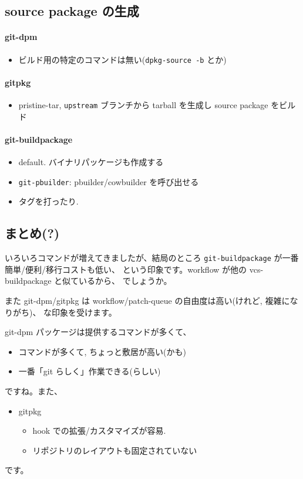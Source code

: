 \documentclass[mingoth,a4paper]{jsarticle}
\begin{document}
\subsection*{source package の生成}
\label{sec-5}

\label{sec-5-1}
\paragraph{git-dpm}
\label{sec-5-1-1}

\begin{itemize}
\item ビルド用の特定のコマンドは無い(\texttt{dpkg-source -b} とか)
\end{itemize}
\paragraph{gitpkg}
\label{sec-5-1-2}

\begin{itemize}
\item pristine-tar, \texttt{upstream} ブランチから tarball を生成し
      source package をビルド
\end{itemize}
\paragraph{git-buildpackage}
\label{sec-5-1-3}

\begin{itemize}
\item default. バイナリパッケージも作成する
\item \texttt{git-pbuilder}: pbuilder/cowbuilder を呼び出せる
\item タグを打ったり.
\end{itemize}
\subsection*{まとめ(?)}
\label{sec-6}

いろいろコマンドが増えてきましたが、結局のところ
\texttt{git-buildpackage} が一番簡単/便利/移行コストも低い、
という印象です。workflow が他の vcs-buildpackage と似ているから、
でしょうか。

また git-dpm/gitpkg は
workflow/patch-queue の自由度は高い(けれど, 複雑になりがち)、
な印象を受けます。

git-dpm パッケージは提供するコマンドが多くて、
\begin{itemize}
  \item コマンドが多くて, ちょっと敷居が高い(かも)
  \item 一番「git らしく」作業できる(らしい)
\end{itemize}
ですね。また、
\begin{itemize}
\item gitpkg
  \begin{itemize}
  \item hook での拡張/カスタマイズが容易.
  \item リポジトリのレイアウトも固定されていない
  \end{itemize}
\end{itemize}
です。
\end{document}
